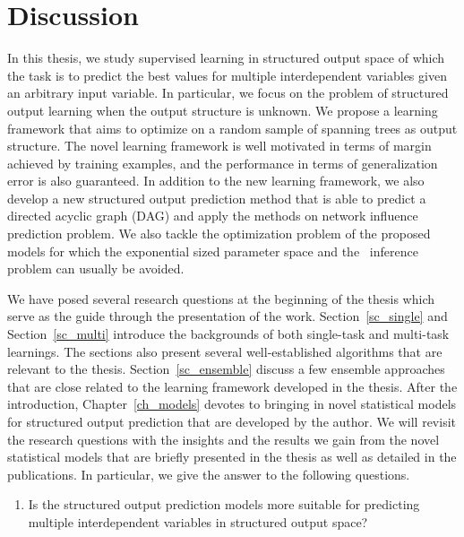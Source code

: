 {%
\section{Discussion}

In this thesis, we study supervised learning in structured output space of which the task is to predict the best values for multiple interdependent variables given an arbitrary input variable.
In particular, we focus on the problem of structured output learning when the output structure is unknown.
We propose a learning framework that aims to optimize on a random sample of spanning trees as output structure.
The novel learning framework is well motivated in terms of margin achieved by training examples, and the performance in terms of generalization error is also guaranteed.
In addition to the new learning framework, we also develop a new structured output prediction method that is able to predict a directed acyclic graph (DAG) and apply the methods on network influence prediction problem.
We also tackle the optimization problem of the proposed models for which the exponential sized parameter space and the \nphard\ inference problem can usually be avoided.

We have posed several research questions at the beginning of the thesis which serve as the guide through the presentation of the work.
Section~\ref{sc_single} and Section~\ref{sc_multi} introduce the backgrounds of both single-task and multi-task learnings.
The sections also present several well-established algorithms that are relevant to the thesis.
Section~\ref{sc_ensemble} discuss a few ensemble approaches that are close related to the learning framework developed in the thesis.
After the introduction, Chapter~\ref{ch_models} devotes to bringing in novel statistical models for structured output prediction that are developed by the author.
We will revisit the research questions with the insights and the results we gain from the novel statistical models that are briefly presented in the thesis as well as detailed in the publications.
In particular, we give the answer to the following questions.

\begin{enumerate}[label=\textbf{Q \Roman*}:]
\item Is the structured output prediction models more suitable for predicting multiple interdependent variables in structured output space?


\end{enumerate}}
